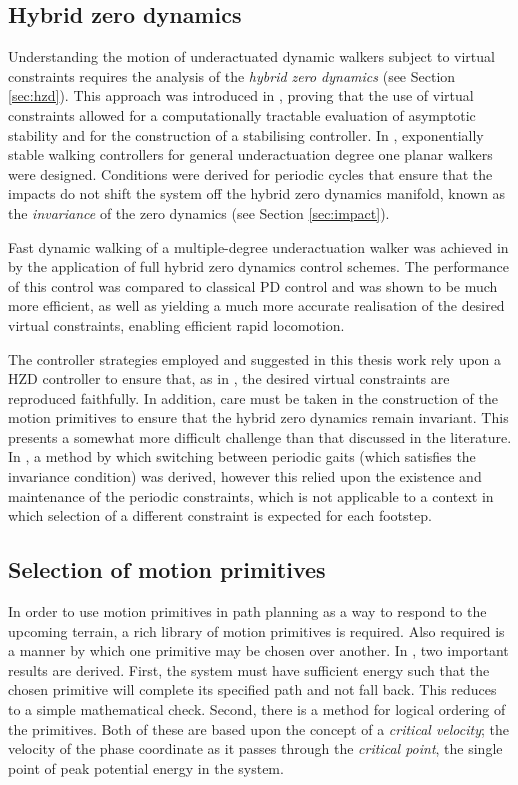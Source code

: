\subsection{Hybrid zero dynamics}
Understanding the motion of underactuated dynamic walkers subject to virtual constraints requires the analysis of the \textit{hybrid zero dynamics} (see Section \ref{sec:hzd}). This approach was introduced in \cite{grizzle2001asymptotically}, proving that the use of virtual constraints allowed for a computationally tractable evaluation of asymptotic stability and for the construction of a stabilising controller. In \cite{westervelt2003hybrid}, exponentially stable walking controllers for general underactuation degree one planar walkers were designed. Conditions were derived for periodic cycles that ensure that the impacts do not shift the system off the hybrid zero dynamics manifold, known as the \textit{invariance} of the zero dynamics (see Section \ref{sec:impact}). 

Fast dynamic walking of a multiple-degree underactuation walker was achieved in \cite{sreenath2011compliant} by the application of full hybrid zero dynamics control schemes. The performance of this control was compared to classical PD control and was shown to be much more efficient, as well as yielding a much more accurate realisation of the desired virtual constraints, enabling efficient rapid locomotion. 

The controller strategies employed and suggested in this thesis work rely upon a HZD controller to ensure that, as in \cite{sreenath2011compliant}, the desired virtual constraints are reproduced faithfully. In addition, care must be taken in the construction of the motion primitives to ensure that the hybrid zero dynamics remain invariant. This presents a somewhat more difficult challenge than that discussed in the literature. In \cite{westervelt2007feedback}, a method by which switching between periodic gaits (which satisfies the invariance condition) was derived, however this relied upon the existence and maintenance of the periodic constraints, which is not applicable to a context in which selection of a different constraint is expected for each footstep.

\subsection{Selection of motion primitives}\label{sec:selection}
In order to use motion primitives in path planning as a way to respond to the upcoming terrain, a rich library of motion primitives is required. Also required is a manner by which one primitive may be chosen over another. In \cite{manchester13planning}, two important results are derived. First, the system must have sufficient energy such that the chosen primitive will complete its specified path and not fall back. This reduces to a simple mathematical check. Second, there is a method for logical ordering of the primitives. Both of these are based upon the concept of a \textit{critical velocity}; the velocity of the phase coordinate as it passes through the \textit{critical point}, the single point of peak potential energy in the system. 


